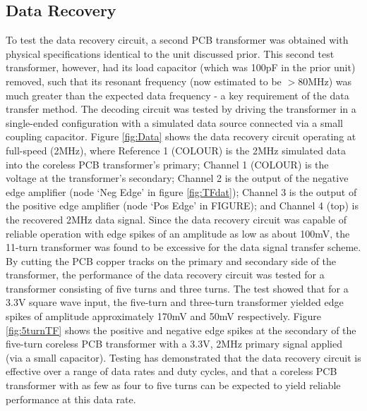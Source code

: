 \documentclass[conference]{IEEEtran}
\begin{document}
	\subsection{Data Recovery}
	To test the data recovery circuit, a second PCB transformer was obtained with physical specifications identical to the unit discussed prior.  This second test transformer, however, had its load capacitor (which was 100pF in the prior unit) removed, such that its resonant frequency (now estimated to be $>$80MHz) was much greater than the expected data frequency - a key requirement of the data transfer method.  The decoding circuit was tested by driving the transformer in a single-ended configuration with a simulated data source connected via a small coupling capacitor.  Figure \ref{fig:Data} shows the data recovery circuit operating at full-speed (2MHz), where Reference 1 (COLOUR) is the 2MHz simulated data into the coreless PCB transformer's primary; Channel 1 (COLOUR) is the voltage at the transformer's secondary; Channel 2 is the output of the negative edge amplifier (node `Neg Edge' in figure \ref{fig:TFdat}); Channel 3 is the output of the positive edge amplifier (node `Pos Edge' in FIGURE); and Channel 4 (top) is the recovered 2MHz data signal.
	Since the data recovery circuit was capable of reliable operation with edge spikes of an amplitude as low as about 100mV, the 11-turn transformer was found to be excessive for the data signal transfer scheme.  By cutting the PCB copper tracks on the primary and secondary side of the transformer, the performance of the data recovery circuit was tested for a transformer consisting of five turns and three turns.  The test showed that for a 3.3V square wave input, the five-turn and three-turn transformer yielded edge spikes of amplitude approximately 170mV and 50mV respectively.  Figure \ref{fig:5turnTF} shows the positive and negative edge spikes at the secondary of the five-turn coreless PCB transformer with a 3.3V, 2MHz primary signal applied (via a small capacitor).  Testing has demonstrated that the data recovery circuit is effective over a range of data rates and duty cycles, and that a coreless PCB transformer with as few as four to five turns can be expected to yield reliable performance at this data rate.
	
\end{document}
